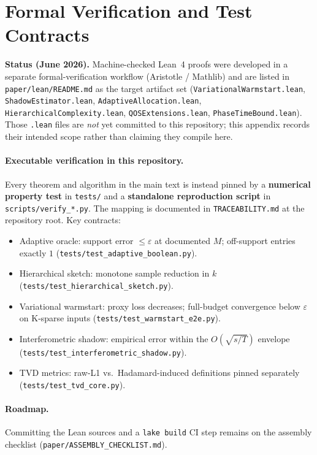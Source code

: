 \section{Formal Verification and Test Contracts}
\label{app:lean}

\textbf{Status (June 2026).}  Machine-checked Lean~4 proofs were developed in
a separate formal-verification workflow (Aristotle / Mathlib) and are listed in
\texttt{paper/lean/README.md} as the target artifact set
(\texttt{VariationalWarmstart.lean}, \texttt{ShadowEstimator.lean},
\texttt{AdaptiveAllocation.lean}, \texttt{HierarchicalComplexity.lean},
\texttt{QOSExtensions.lean}, \texttt{PhaseTimeBound.lean}).  Those \texttt{.lean}
files are \emph{not} yet committed to this repository; this appendix records
their intended scope rather than claiming they compile here.

\paragraph{Executable verification in this repository.}
Every theorem and algorithm in the main text is instead pinned by a
\textbf{numerical property test} in \texttt{tests/} and a \textbf{standalone
reproduction script} in \texttt{scripts/verify\_*.py}.  The mapping is
documented in \texttt{TRACEABILITY.md} at the repository root.  Key contracts:
\begin{itemize}
  \item Adaptive oracle: support error $\leq \varepsilon$ at documented $M$;
        off-support entries exactly $1$ (\texttt{tests/test\_adaptive\_boolean.py}).
  \item Hierarchical sketch: monotone sample reduction in $k$
        (\texttt{tests/test\_hierarchical\_sketch.py}).
  \item Variational warmstart: proxy loss decreases; full-budget convergence
        below $\varepsilon$ on K-sparse inputs
        (\texttt{tests/test\_warmstart\_e2e.py}).
  \item Interferometric shadow: empirical error within the $O(\sqrt{s/T})$ envelope
        (\texttt{tests/test\_interferometric\_shadow.py}).
  \item TVD metrics: raw-L1 vs.\ Hadamard-induced definitions pinned separately
        (\texttt{tests/test\_tvd\_core.py}).
\end{itemize}

\paragraph{Roadmap.}  Committing the Lean sources and a \texttt{lake build} CI
step remains on the assembly checklist (\texttt{paper/ASSEMBLY\_CHECKLIST.md}).
